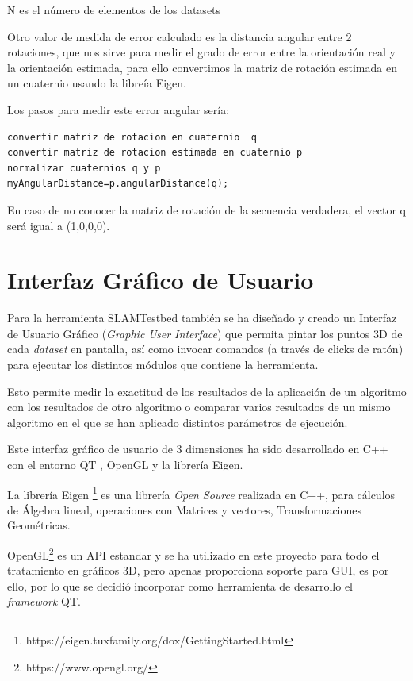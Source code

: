       N es el número de elementos de los datasets

Otro valor de medida de error calculado es la distancia angular entre 2 rotaciones, que nos sirve para medir el grado de error entre la orientación real y la orientación estimada, para ello convertimos la matriz de rotación estimada en un cuaternio usando la libreía Eigen.

Los pasos para medir este error angular sería:
\begin{lstlisting}[frame=single]
convertir matriz de rotacion en cuaternio  q
convertir matriz de rotacion estimada en cuaternio p
normalizar cuaternios q y p
myAngularDistance=p.angularDistance(q);

\end{lstlisting}

En caso de no conocer la matriz de rotación de la secuencia verdadera, el vector q será igual a (1,0,0,0).








\section{Interfaz Gráfico de Usuario}
Para la herramienta SLAMTestbed también se ha diseñado y creado un Interfaz de Usuario Gráfico (\textit{Graphic User Interface}) que permita pintar los puntos 3D de cada \textit{dataset} en pantalla, así como invocar comandos (a través de clicks de ratón) para ejecutar los distintos módulos que contiene la herramienta.

Esto permite medir la exactitud de los resultados de la aplicación de un algoritmo con los resultados de otro algoritmo o comparar varios resultados de un mismo algoritmo en el que se han aplicado distintos parámetros de ejecución.

Este interfaz gráfico de usuario de 3 dimensiones ha sido desarrollado en C++ con el entorno QT , OpenGL y la librería Eigen. 

La librería Eigen \footnote{https://eigen.tuxfamily.org/dox/GettingStarted.html} es una librería \textit{Open Source} realizada en C++, para cálculos de Álgebra lineal, operaciones con Matrices y vectores, Transformaciones Geométricas. 

OpenGL\footnote{https://www.opengl.org/} es un API estandar y se ha utilizado en este proyecto para todo el tratamiento en gráficos 3D, pero apenas proporciona soporte para GUI, es por ello, por lo que se decidió incorporar como herramienta de desarrollo el \textit{framework} QT. 

